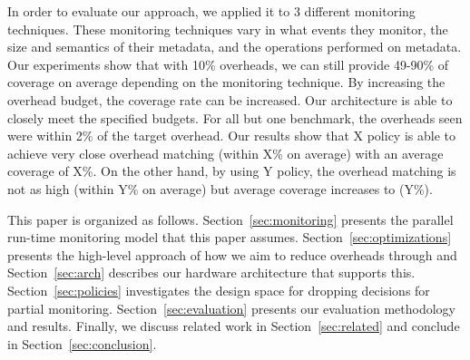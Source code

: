 
In order to evaluate our approach, we applied it to 3 different monitoring
techniques. These monitoring techniques vary in what events they monitor, the
size and semantics of their metadata, and the operations performed on metadata.
Our experiments show that with 10\% overheads, we can still provide 49-90\% of
coverage on average depending on the monitoring technique. By increasing the
overhead budget, the coverage rate can be increased. Our architecture is able
to closely meet the specified budgets. For all but one benchmark, the overheads
seen were within 2\% of the target overhead. Our results show that X policy is
able to achieve very close overhead matching (within X\% on average) with an
average coverage of X\%. On the other hand, by using Y policy, the overhead
matching is not as high (within Y\% on average) but average coverage increases
to (Y\%).

This paper is organized as follows. Section~\ref{sec:monitoring} presents the
parallel run-time monitoring model that this paper assumes.
Section~\ref{sec:optimizations} presents the high-level approach of how we aim
to reduce overheads through and Section~\ref{sec:arch} describes our
hardware architecture that supports this. Section~\ref{sec:policies}
investigates the design space for dropping decisions for partial monitoring.
Section~\ref{sec:evaluation} presents our evaluation methodology and
results. Finally, we discuss related work in Section~\ref{sec:related} and
conclude in Section~\ref{sec:conclusion}.

